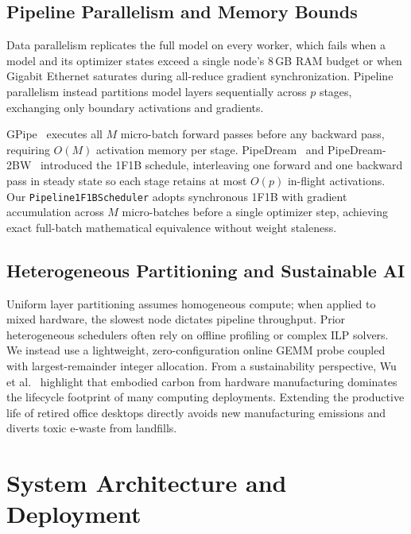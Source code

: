 \documentclass[conference]{IEEEtran}
\begin{document}
\subsection{Pipeline Parallelism and Memory Bounds}
Data parallelism replicates the full model on every worker, which fails when a model and its optimizer states exceed a single node's 8\,GB RAM budget or when Gigabit Ethernet saturates during all-reduce gradient synchronization. Pipeline parallelism instead partitions model layers sequentially across $p$ stages, exchanging only boundary activations and gradients.

GPipe~\cite{gpipe2019} executes all $M$ micro-batch forward passes before any backward pass, requiring $O(M)$ activation memory per stage. PipeDream~\cite{pipedream2019} and PipeDream-2BW~\cite{pipedream2bw2021} introduced the 1F1B schedule, interleaving one forward and one backward pass in steady state so each stage retains at most $O(p)$ in-flight activations. Our \texttt{Pipeline1F1BScheduler} adopts synchronous 1F1B with gradient accumulation across $M$ micro-batches before a single optimizer step, achieving exact full-batch mathematical equivalence without weight staleness.

\subsection{Heterogeneous Partitioning and Sustainable AI}
Uniform layer partitioning assumes homogeneous compute; when applied to mixed hardware, the slowest node dictates pipeline throughput. Prior heterogeneous schedulers often rely on offline profiling or complex ILP solvers. We instead use a lightweight, zero-configuration online GEMM probe coupled with largest-remainder integer allocation. From a sustainability perspective, Wu et al.~\cite{sustainable_ai2022} highlight that embodied carbon from hardware manufacturing dominates the lifecycle footprint of many computing deployments. Extending the productive life of retired office desktops directly avoids new manufacturing emissions and diverts toxic e-waste from landfills.

\section{System Architecture and Deployment}
\end{document}
